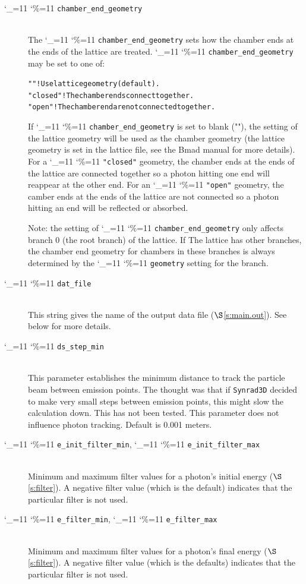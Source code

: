 \documentclass[11pt,openany]{report}
\newcommand{\sref}[1]{$\S$\ref{#1}}
\newcommand{\srthree}{\texttt{Synrad3D}\xspace}
\newcommand\ttcmd{\begingroup\catcode`\_=11 \catcode`\%=11 \dottcmd}
\newcommand\dottcmd[1]{\texttt{#1}\endgroup}
\newcommand{\vn}{\ttcmd}
\newcommand{\Newline}{\hfil \\}
\newlength{\ExBeg}
\newlength{\ExEnd}
\newenvironment{example}
  {\vspace{\ExBeg} \begin{alltt}}
  {\end{alltt} \vspace{\ExEnd}}
\begin{document}
  \begin{description}
  \item[\vn{chamber_end_geometry}] \Newline
The \vn{chamber_end_geometry} sets how the chamber ends at the ends of the lattice
are treated. \vn{chamber_end_geometry} may be set to one of:
\begin{example}
  ""            ! Use lattice geometry (default).
  "closed"      ! The chamber ends connect together.
  "open"        ! The chamber end are not connected together.
\end{example}
If \vn{chamber_end_geometry} is set to blank (""), the setting of the lattice geometry
will be used as the chamber geometry (the lattice geometry is set in the lattice file, see
the Bmad manual\cite{b:bmad} for more details). For a \vn{"closed"} geometry, the chamber
ends at the ends of the lattice are connected together so a photon hitting one end will
reappear at the other end.  For an \vn{"open"} geometry, the camber ends at the ends of
the lattice are not connected so a photon hitting an end will be reflected or absorbed.

Note: the setting of \vn{chamber_end_geometry} only affects branch 0 (the root branch) of
the lattice. If The lattice has other branches, the chamber end geometry for chambers in
these branches is always determined by the \vn{geometry} setting for the branch.

  \item[\vn{dat_file}] \Newline
This string gives the name of the output data file (\sref{s:main.out}). See below for more details.

  \item[\vn{ds_step_min}] \Newline
This parameter establishes the minimum distance to track the particle beam between emission
points. The thought was that if \srthree decided to make very small steps  between emission
points, this might slow the calculation down. This has not been tested. This parameter
does not influence photon tracking. Default is 0.001 meters.

  \item[\vn{e_init_filter_min}, \vn{e_init_filter_max}] \Newline
Minimum and maximum filter values for a photon's initial energy (\sref{s:filter}). A negative filter
value (which is the default) indicates that the particular filter is not used.

  \item[\vn{e_filter_min}, \vn{e_filter_max}] \Newline
Minimum and maximum filter values for a photon's final energy (\sref{s:filter}). A negative filter
value (which is the defaults) indicates that the particular filter is not used. 


\end{description}
\end{document}
